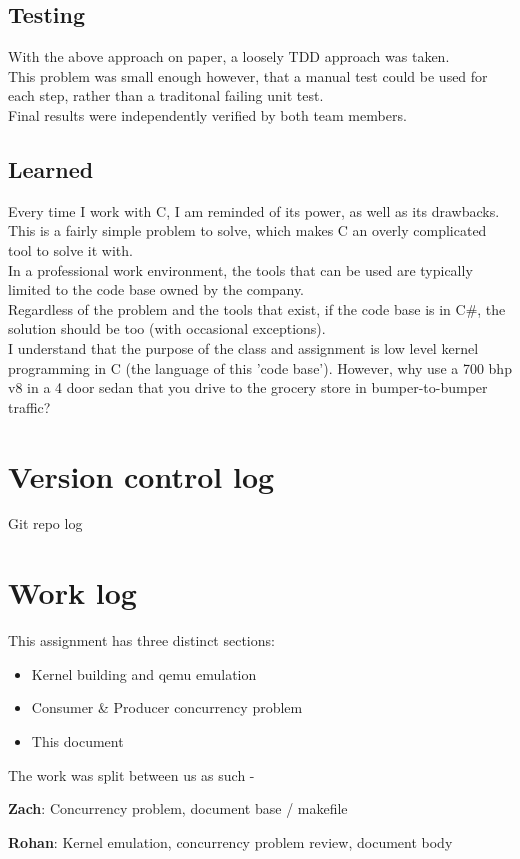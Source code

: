 \documentclass[letterpaper,10pt,fleqn]{article}
\begin{document}
	\subsection*{Testing}
	With the above approach on paper, a loosely TDD approach was taken.
	\\This problem was small enough however, that a manual test could be used for each step, rather than a traditonal failing unit test.
	\\Final results were independently verified by both team members.
	\subsection*{Learned}
	Every time I work with C, I am reminded of its power, as well as its drawbacks.
	This is a fairly simple problem to solve, which makes C an overly complicated tool to solve it with.
	\\In a professional work environment, the tools that can be used are typically limited to the code base owned by the company.
	\\Regardless of the problem and the tools that exist, if the code base is in C\#, the solution should be too (with occasional exceptions).
	\\I understand that the purpose of the class and assignment is low level kernel programming in C (the language of this 'code base').
	However, why use a 700 bhp v8 in a 4 door sedan that you drive to the grocery store in bumper-to-bumper traffic?

	\section*{Version control log}
	Git repo log

	\section*{Work log}
	This assignment has three distinct sections:
	\begin{itemize}
		\item Kernel building and qemu emulation
		\item Consumer \& Producer concurrency problem
		\item This document
	\end{itemize}
	The work was split between us as such -

	\textbf{Zach}: Concurrency problem, document base / makefile

	\textbf{Rohan}: Kernel emulation, concurrency problem review, document body
\end{document}
